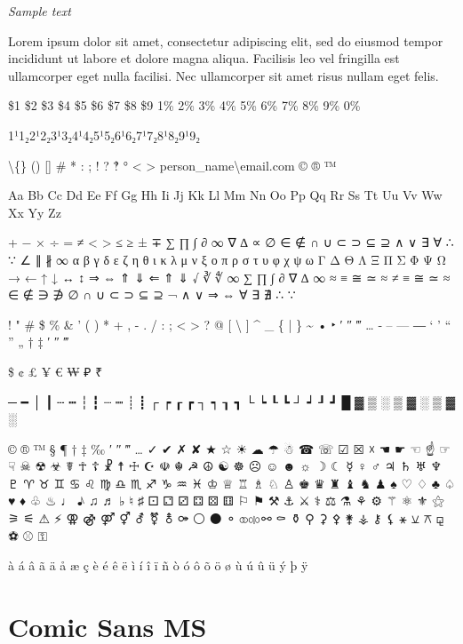 \begin{raggedright}
\emph{Sample text}

Lorem ipsum dolor sit amet, consectetur adipiscing elit, sed do eiusmod tempor incididunt ut labore et dolore magna aliqua. Facilisis leo vel fringilla est ullamcorper eget nulla facilisi. Nec ullamcorper sit amet risus nullam eget felis.

\$1 \$2 \$3 \$4 \$5 \$6 \$7 \$8 \$9 1\% 2\% 3\% 4\% 5\% 6\% 7\% 8\% 9\% 0\%

1¹1₂2¹2₂3¹3₂4¹4₂5¹5₂6¹6₂7¹7₂8¹8₂9¹9₂

\textbackslash\{\} () [] \# * : ; ! ? ‽ ° \textless{} \textgreater{} person\_name\textbackslash{}email.com © ® ™

Aa Bb Cc Dd Ee Ff Gg Hh Ii Jj Kk Ll Mm Nn Oo Pp Qq Rr Ss Tt Uu Vv Ww Xx Yy Zz

+ − × ÷ = ≠ < > ≤ ≥ ± ∓
∑ ∏ ∫ ∂ ∞ ∇ ∆ ∝ ∅ ∈ ∉ ∩ ∪ ⊂ ⊃ ⊆ ⊇ ∧ ∨ ∃ ∀ ∴ ∵ ∠ ∥ ∦ ∞
α β γ δ ε ζ η θ ι κ λ μ ν ξ ο π ρ σ τ υ φ χ ψ ω
Γ Δ Θ Λ Ξ Π Σ Φ Ψ Ω
→ ← ↑ ↓ ↔ ↕ ⇒ ⇔ ⇑ ⇓ ⇐ ⇑ ⇓
√ ∛ ∜ ∞ ∑ ∏ ∫ ∂ ∇ ∆ ∞ ≈ ≡ ≅ ≃ ≈ ≠ ≡ ≅ ≃ ≈
∈ ∉ ∋ ∌ ∅ ∩ ∪ ⊂ ⊃ ⊆ ⊇
¬ ∧ ∨ ⇒ ⇔ ∀ ∃ ∄ ∴ ∵

! " \# \$ \% \& ' ( ) * + , - . / : ; \textless{} \textgreater{} ? @ [ \textbackslash{} ] \^{} \_ \{ | \} \~{}
• ‣ ′ ″ ‴ … ‐ – — ― ‘ ’ “ ” „ † ‡ ′ ″ ‴

\$ ¢ £ ¥ € ₩ ₽ ₹

─ ━ │ ┃ ┄ ┅ ┆ ┇ ┈ ┉ ┊ ┋ ┌ ┍ ┎ ┏ ┐ ┑ ┒ ┓ └ ┕ ┖ ┗ ┘ ┙ ┚ ┛
█ ▓ ▒ ░ ▒ ▓ ░ ▒ ▓ ░

© ® ™ § ¶ † ‡ ‰ ′ ″ ‴ … ✓ ✔ ✗ ✘ ★ ☆ ☀ ☁ ☂ ☃ ☎ ☏ ☑ ☒ ☓ ☚ ☛ ☜ ☝ ☞ ☟ ☠ ☢ ☣ ☤ ☥ ☦ ☧ ☨ ☩ ☪ ☫ ☬ ☭ ☮ ☯ ☸ ☹ ☺ ☻ ☼ ☽ ☾ ☿ ♀ ♂ ♃ ♄ ♅ ♆ ♇ ♈ ♉ ♊ ♋ ♌ ♍ ♎ ♏ ♐ ♑ ♒ ♓ ♔ ♕ ♖ ♗ ♘ ♙ ♚ ♛ ♜ ♝ ♞ ♟ ♠ ♡ ♢ ♣ ♤ ♥ ♦ ♧ ♨ ♩ ♪ ♫ ♬ ♭ ♮ ♯ ⚀ ⚁ ⚂ ⚃ ⚄ ⚅ ⚐ ⚑ ⚒ ⚓ ⚔ ⚕ ⚖ ⚗ ⚘ ⚙ ⚚ ⚛ ⚜ ⚝ ⚞ ⚟ ⚠ ⚡ ⚢ ⚣ ⚤ ⚥ ⚦ ⚧ ⚨ ⚩ ⚪ ⚫ ⚬ ⚭ ⚮ ⚯ ⚰ ⚱ ⚲ ⚳ ⚴ ⚵ ⚶ ⚷ ⚸ ⚹ ⚺ ⚻ ⚼ ⚽ ⚾ ⚿

à á â ã ä å æ ç è é ê ë ì í î ï ñ ò ó ô õ ö ø ù ú û ü ý þ ÿ
\end{raggedright}

\pagebreak
\section{Comic Sans MS}\label{trouble9}

